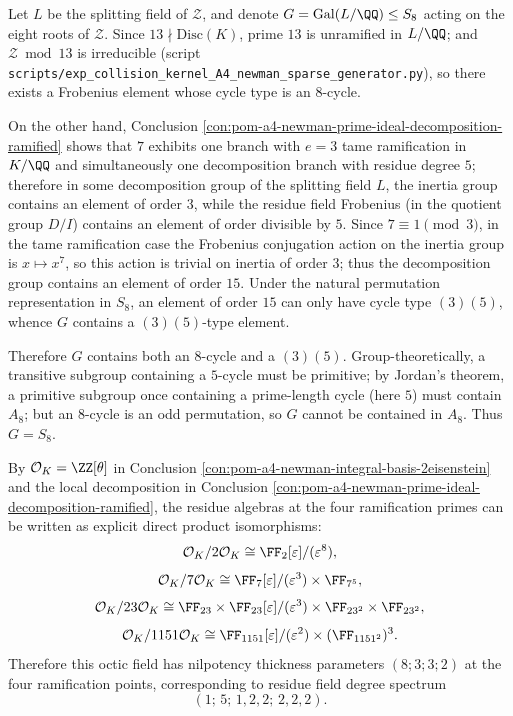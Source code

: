 \begin{conclusion}["Two-Prime Certificate" Forces \texorpdfstring{$S_8$}{S8}: Generated by \((3)(5)\) at \(p=7\) and \(8\)-Cycle at \(p=13\)]\label{con:pom-a4-newman-two-prime-s8}
Let \(L\) be the splitting field of \(\mathcal Z\), and denote \(G=\mathrm{Gal}(L/\QQ)\le S_8\) acting on the eight roots of \(\mathcal Z\).
Since \(13\nmid \mathrm{Disc}(K)\), prime \(13\) is unramified in \(L/\QQ\); and \(\mathcal Z\bmod 13\) is irreducible (script \texttt{scripts/exp\_collision\_kernel\_A4\_newman\_sparse\_generator.py}), so there exists a Frobenius element whose cycle type is an \(8\)-cycle.
\par
On the other hand, Conclusion \ref{con:pom-a4-newman-prime-ideal-decomposition-ramified} shows that \(7\) exhibits one branch with \(e=3\) tame ramification in \(K/\QQ\) and simultaneously one decomposition branch with residue degree \(5\);
therefore in some decomposition group of the splitting field \(L\), the inertia group contains an element of order \(3\), while the residue field Frobenius (in the quotient group \(D/I\)) contains an element of order divisible by \(5\).
Since \(7\equiv 1\pmod 3\), in the tame ramification case the Frobenius conjugation action on the inertia group is \(x\mapsto x^{7}\), so this action is trivial on inertia of order \(3\);
thus the decomposition group contains an element of order \(15\).
Under the natural permutation representation in \(S_8\), an element of order \(15\) can only have cycle type \((3)(5)\), whence \(G\) contains a \((3)(5)\)-type element.
\par
Therefore \(G\) contains both an \(8\)-cycle and a \((3)(5)\).
Group-theoretically, a transitive subgroup containing a \(5\)-cycle must be primitive; by Jordan's theorem, a primitive subgroup once containing a prime-length cycle (here \(5\)) must contain \(A_8\);
but an \(8\)-cycle is an odd permutation, so \(G\) cannot be contained in \(A_8\).
Thus \(G=S_8\).
\end{conclusion}

\begin{conclusion}\label{con:pom-a4-newman-residue-algebra-decomposition}
By \(\mathcal O_K=\ZZ[\theta]\) in Conclusion \ref{con:pom-a4-newman-integral-basis-2eisenstein} and the local decomposition in Conclusion \ref{con:pom-a4-newman-prime-ideal-decomposition-ramified},
the residue algebras at the four ramification primes can be written as explicit direct product isomorphisms:
\[
\mathcal O_K/2\mathcal O_K \cong \FF_2[\varepsilon]/(\varepsilon^8),
\]
\[
\mathcal O_K/7\mathcal O_K \cong \FF_7[\varepsilon]/(\varepsilon^3)\times \FF_{7^5},
\]
\[
\mathcal O_K/23\mathcal O_K \cong \FF_{23}\times \FF_{23}[\varepsilon]/(\varepsilon^3)\times \FF_{23^2}\times \FF_{23^2},
\]
\[
\mathcal O_K/1151\mathcal O_K \cong \FF_{1151}[\varepsilon]/(\varepsilon^2)\times (\FF_{1151^2})^{3}.
\]
Therefore this octic field has nilpotency thickness parameters \((8;3;3;2)\) at the four ramification points, corresponding to residue field degree spectrum
\[
(1;\,5;\,1,2,2;\,2,2,2).
\]
\end{conclusion}

